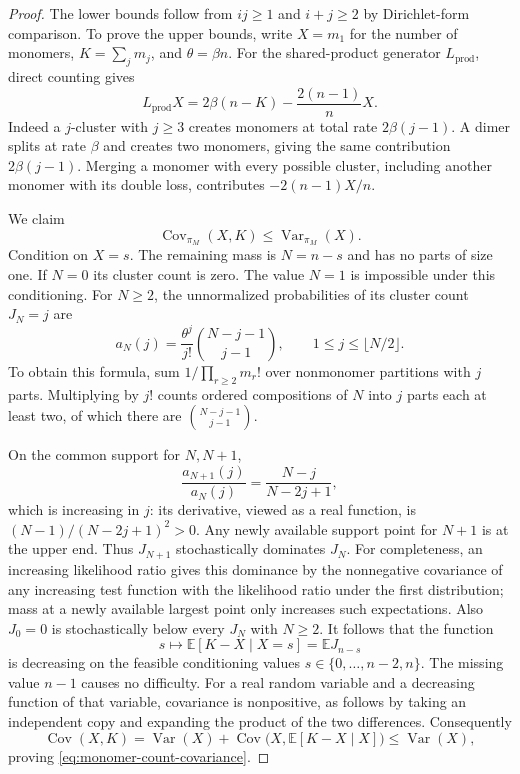 \begin{proof}
The lower bounds follow from $ij\ge1$ and $i+j\ge2$ by
Dirichlet-form comparison.  To prove the upper bounds, write
$X=m_1$ for the number of monomers, $K=\sum_jm_j$, and
$\theta=\beta n$.
For the shared-product generator $L_{\mathrm{prod}}$, direct counting
gives
\begin{equation}\label{eq:monomer-product-drift}
 L_{\mathrm{prod}}X
   =2\beta(n-K)-\frac{2(n-1)}nX.
\end{equation}
Indeed a $j$-cluster with $j\ge3$ creates monomers at total rate
$2\beta(j-1)$.
A dimer splits at rate $\beta$ and creates two monomers, giving the
same contribution $2\beta(j-1)$.
Merging a monomer with every possible cluster, including another
monomer with its double loss, contributes $-2(n-1)X/n$.

We claim
\begin{equation}\label{eq:monomer-count-covariance}
 \operatorname{Cov}_{\pi_M}(X,K)\le\operatorname{Var}_{\pi_M}(X).
\end{equation}
Condition on $X=s$.  The remaining mass is $N=n-s$ and has no parts
of size one.  If $N=0$ its cluster count is zero.
The value $N=1$ is impossible under this conditioning.
For $N\ge2$, the unnormalized probabilities of its cluster count
$J_N=j$ are
\begin{equation}\label{eq:nonmonomer-count-weights}
 a_N(j)=\frac{\theta^j}{j!}\binom{N-j-1}{j-1},
 \qquad 1\le j\le\lfloor N/2\rfloor.
\end{equation}
To obtain this formula, sum $1/\prod_{r\ge2}m_r!$ over nonmonomer
partitions with $j$ parts.  Multiplying by $j!$ counts ordered
compositions of $N$ into $j$ parts each at least two, of which there
are $\binom{N-j-1}{j-1}$.

On the common support for $N,N+1$,
\[
 \frac{a_{N+1}(j)}{a_N(j)}
   =\frac{N-j}{N-2j+1},
\]
which is increasing in $j$: its derivative, viewed as a real
function, is $(N-1)/(N-2j+1)^2>0$.
Any newly available support point for $N+1$ is at the upper end.
Thus $J_{N+1}$ stochastically dominates $J_N$.
For completeness, an increasing likelihood ratio gives this
dominance by the nonnegative covariance of any increasing test
function with the likelihood ratio under the first distribution;
mass at a newly available largest point only increases such
expectations.
Also $J_0=0$ is stochastically below every $J_N$ with $N\ge2$.
It follows that the function
\[
 s\longmapsto\mathbb E[K-X\mid X=s]
       =\mathbb E J_{n-s}
\]
is decreasing on the feasible conditioning values
$s\in\{0,\ldots,n-2,n\}$.
The missing value $n-1$ causes no difficulty.
For a real random variable and a decreasing function of that
variable, covariance is nonpositive, as follows by taking an
independent copy and expanding the product of the two differences.
Consequently
\[
 \operatorname{Cov}(X,K)
 =\operatorname{Var}(X)
   +\operatorname{Cov}\bigl(X,\mathbb E[K-X\mid X]\bigr)
 \le\operatorname{Var}(X),
\]
proving \eqref{eq:monomer-count-covariance}.


\end{proof}
